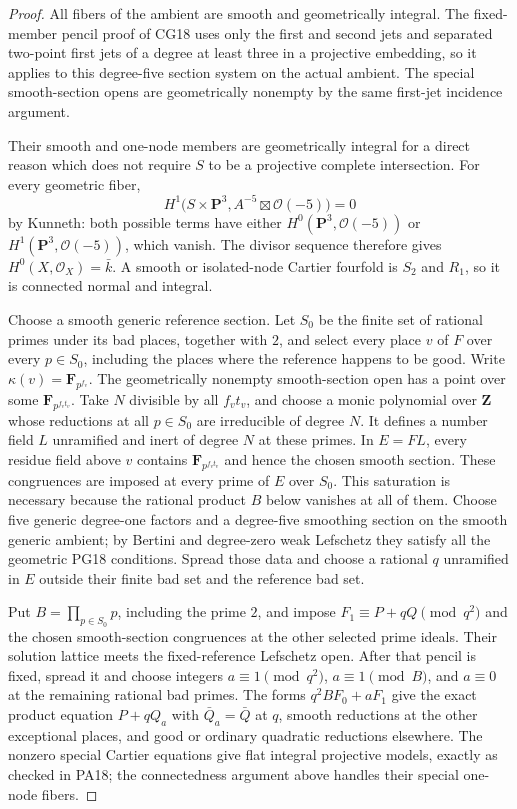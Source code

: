 \begin{proof}
All fibers of the ambient are smooth
and geometrically integral.  The fixed-
member pencil proof of CG18 uses only
the first and second jets and separated
two-point first jets of a degree at
least three in a projective embedding,
so it applies to this degree-five
section system on the actual ambient.
The special smooth-section opens are
geometrically nonempty by the same
first-jet incidence argument.

Their smooth and one-node members are
geometrically integral for a direct
reason which does not require $S$
to be a projective complete intersection.
For every geometric fiber,
\[
 H^1\bigl(S\times\mathbf P^3,
                  A^{-5}\boxtimes\mathcal O(-5)\bigr)=0
\]
by Kunneth: both possible terms have
either $H^0(\mathbf P^3,\mathcal O(-5))$
or $H^1(\mathbf P^3,\mathcal O(-5))$,
which vanish.  The divisor sequence
therefore gives $H^0(X,\mathcal O_X)=\bar k$.
A smooth or isolated-node Cartier
fourfold is $S_2$ and $R_1$, so it
is connected normal and integral.

Choose a smooth generic reference
section.  Let $S_0$ be the finite set
of rational primes under its bad
places, together with $2$, and select
every place $v$ of $F$ over every
$p\in S_0$, including the places
where the reference happens to be good.
Write $\kappa(v)=\mathbf F_{p^{f_v}}$.
The geometrically nonempty smooth-section
open has a point over some
$\mathbf F_{p^{f_vt_v}}$.
Take $N$ divisible by all $f_vt_v$,
and choose a monic polynomial over
$\mathbf Z$ whose reductions at all
$p\in S_0$ are irreducible of degree
$N$.  It defines a number field $L$
unramified and inert of degree $N$
at these primes.  In $E=FL$, every
residue field above $v$ contains
$\mathbf F_{p^{f_vt_v}}$ and hence
the chosen smooth section.  These
congruences are imposed at every
prime of $E$ over $S_0$.
This saturation is necessary because
the rational product $B$ below vanishes
at all of them.  Choose five generic
degree-one factors and a degree-five
smoothing section on the smooth
generic ambient; by Bertini and
degree-zero weak Lefschetz they
satisfy all the geometric PG18
conditions.  Spread those data and
choose a rational $q$ unramified
in $E$ outside their finite bad
set and the reference bad set.

Put $B=\prod_{p\in S_0}p$,
including the prime $2$, and
impose $F_1\equiv P+qQ\pmod{q^2}$
and the chosen smooth-section
congruences at the other selected
prime ideals.  Their solution
lattice meets the fixed-reference
Lefschetz open.  After that
pencil is fixed, spread it and
choose integers $a\equiv1\pmod{q^2}$,
$a\equiv1\pmod B$, and $a\equiv0$
at the remaining rational bad
primes.  The forms $q^2BF_0+aF_1$
give the exact product equation
$P+qQ_a$ with $\bar Q_a=\bar Q$
at $q$, smooth reductions at
the other exceptional places,
and good or ordinary quadratic
reductions elsewhere.  The
nonzero special Cartier equations
give flat integral projective
models, exactly as checked in
PA18; the connectedness argument
above handles their special
one-node fibers.


\end{proof}
